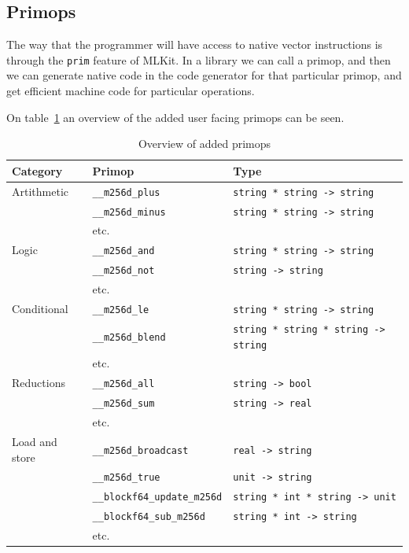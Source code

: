 \documentclass{article}
\begin{document}
\subsection{Primops}
The way that the programmer will have access to native vector instructions is through the \texttt{prim} feature of MLKit. In a library we can call a primop, and then we can generate native code in the code generator for that particular primop, and get efficient machine code for particular operations.

On table~\ref{tbl:primops} an overview of the added user facing primops can be seen.
\begin{table}
\begin{tabular}{l l l}
    \toprule
    Category & Primop & Type \\
    \midrule
    Artithmetic & \verb!__m256d_plus! & \verb!string * string -> string! \\
                & \verb!__m256d_minus! & \verb!string * string -> string! \\
                & etc. & \\
                \midrule 
    Logic       & \verb!__m256d_and! & \verb!string * string -> string! \\
                & \verb!__m256d_not! & \verb!string -> string! \\
                & etc. & \\
                \midrule 
    Conditional & \verb!__m256d_le! & \verb!string * string -> string! \\
                & \verb!__m256d_blend! & \verb!string * string * string -> string! \\
                & etc. & \\
                \midrule 
    Reductions  & \verb!__m256d_all! & \verb!string -> bool! \\
                & \verb!__m256d_sum! & \verb!string -> real! \\
                & etc. & \\
                \midrule 
    Load and store & \verb!__m256d_broadcast! & \verb!real -> string! \\
                   & \verb!__m256d_true! & \verb!unit -> string! \\
                   & \verb!__blockf64_update_m256d! & \verb!string * int * string -> unit! \\
                   & \verb!__blockf64_sub_m256d! & \verb!string * int -> string! \\
                   & etc. & \\
                   \bottomrule
\end{tabular}
\caption{Overview of added primops}
\label{tbl:primops}
\end{table}
\end{document}
